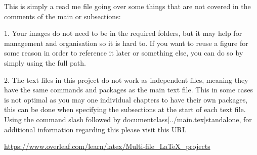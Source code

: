 This is simply a read me file going over some things that are not covered in the comments of the main or subsections:

1. Your images do not need to be in the required folders, but it may help for management and organisation so it is hard to. If you want to reuse a figure for some reason in order to reference it later or something else, you can do so by simply using the full path.

2. The text files in this project do not work as independent files, meaning they have the same commands and packages as the main text file. This in some cases is not optimal as you may one individual chapters to have their own packages, this can be done when specifying the subsections at the start of each text file. Using the command slash followed by documentclass[../main.tex]{standalone}, for additional information regarding this please visit this URL 

\href{https://www.overleaf.com/learn/latex/Multi-file_LaTeX_projects}{https://www.overleaf.com/learn/latex/Multi-file_LaTeX_projects}